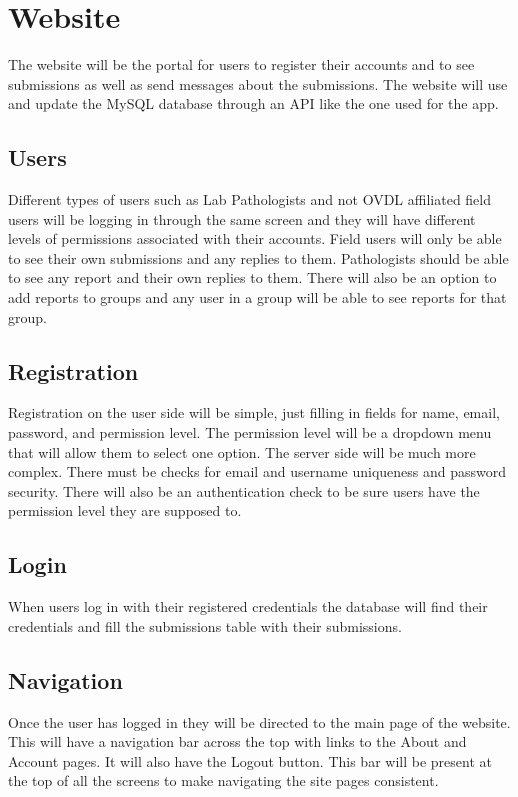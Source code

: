 \documentclass[onecolumn, draftclsnofoot,10pt, compsoc]{IEEEtran}
\begin{document}
\section{Website}
The website will be the portal for users to register their accounts and to see submissions as well as send messages about the submissions. The website will use and update the MySQL database through an API like the one used for the app.

\subsection{Users}
Different types of users such as Lab Pathologists and not OVDL affiliated field users will be logging in through the same screen and they will have different levels of permissions associated with their accounts. Field users will only be able to see their own submissions and any replies to them. Pathologists should be able to see any report and their own replies to them. There will also be an option to add reports to groups and any user in a group will be able to see reports for that group.

\subsection{Registration}
Registration on the user side will be simple, just filling in fields for name, email, password, and permission level. The permission level will be a dropdown menu that will allow them to select one option. The server side will be much more complex. There must be checks for email and username uniqueness and password security. There will also be an authentication check to be sure users have the permission level they are supposed to.

\subsection{Login}
When users log in with their registered credentials the database will find their credentials and fill the submissions table with their submissions.

\subsection{Navigation}
Once the user has logged in they will be directed to the main page of the website. This will have a navigation bar across the top with links to the About and Account pages. It will also have the Logout button. This bar will be present at the top of all the screens to make navigating the site pages consistent.
\end{document}
